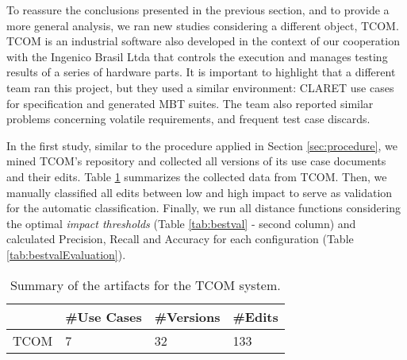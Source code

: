 To reassure the conclusions presented in the previous section, and to provide a more general analysis, we ran new studies considering a different object, TCOM. TCOM is an industrial software also developed in the context of our cooperation with the Ingenico Brasil Ltda that controls the execution and manages testing results of a series of hardware parts. It is important to highlight that a different team ran this project, but they used a similar environment:  CLARET use cases for specification and generated MBT suites. The team also reported similar problems concerning volatile requirements, and frequent test case discards.

In the first study, similar to the procedure applied in Section \ref{sec:procedure}, we mined TCOM's repository and collected all versions of its use case documents and their edits. Table \ref{tab:useCasesEvaluation} summarizes the collected data from TCOM. Then, we manually classified all edits between low and high impact to serve as validation for the automatic classification. Finally, we run all distance functions considering the optimal \textit{impact thresholds} (Table \ref{tab:bestval} - second column) and calculated Precision, Recall and Accuracy for each configuration (Table \ref{tab:bestvalEvaluation}).

\begin{table}[]
\centering
\caption{Summary of the artifacts for the TCOM system.}
\label{tab:useCasesEvaluation}
\begin{tabular}{|l|l|l|l|}
\hline
     & \#Use Cases & \#Versions &\#Edits \\ \hline
TCOM &     7      &      32    &     133         \\  \hline
\end{tabular}
\end{table}



